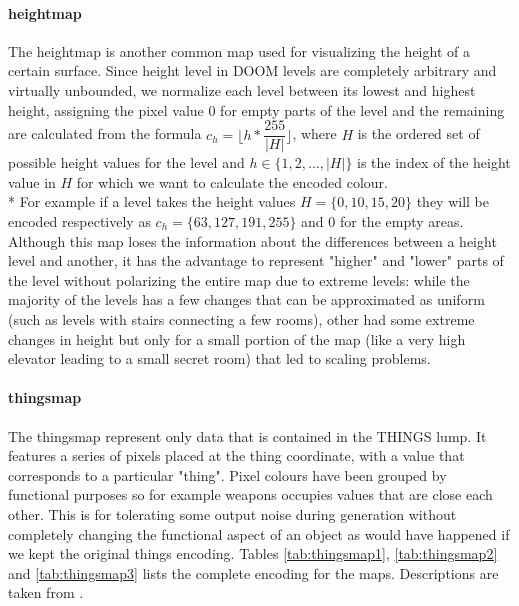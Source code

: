 \paragraph{\gls{heightmap}} The \gls{heightmap} is another common map used for visualizing the height of a certain surface. Since height level in DOOM levels are completely arbitrary and virtually unbounded, we normalize each level between its lowest and highest height, assigning the pixel value 0 for empty parts of the level and the remaining are calculated from the formula $ c_{h} = \lfloor h * \dfrac{255}{|H|} \rfloor $, where $ H $ is the ordered set of possible height values for the level and $ h \in \{1, 2, ..., |H| \} $ is the index of the height value in $ H $ for which we want to calculate the encoded colour. \\*
 For example if a level takes the height values $ H = \{ 0, 10, 15, 20 \} $ they will be encoded respectively as $ c_{h} = \{ 63, 127, 191, 255\} $ and 0 for the empty areas. Although this map loses the information about the differences between a height level and another, it has the advantage to represent "higher" and "lower" parts of the level without polarizing the entire map due to extreme levels: while the majority of the levels has a few changes that can be approximated as uniform (such as levels with stairs connecting a few rooms), other had some extreme changes in height but only for a small portion of the map (like a very high elevator leading to a small secret room) that led to scaling problems.
 
\paragraph{\gls{thingsmap}} The \gls{thingsmap} represent only data that is contained in the THINGS lump. It features a series of pixels placed at the thing coordinate, with a value that corresponds to a particular "thing". Pixel colours have been grouped by functional purposes so for example weapons occupies values that are close each other. This is for tolerating some output noise during generation without completely changing the functional aspect of an object as would have happened if we kept the original things encoding. Tables \ref{tab:thingsmap1}, \ref{tab:thingsmap2} and \ref{tab:thingsmap3} lists the complete encoding for the maps. Descriptions are taken from \cite{wiki:thingtypes}.

